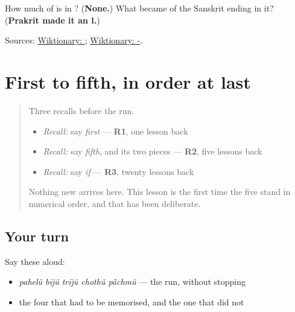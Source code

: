 \begin{tcolorbox}[breakable,colback=teal!4,colframe=teal!35!black,title={Before you move on}]
How much of \textbf{} is in \textbf{}? (\textbf{None.}) What became of the Sanskrit ending in it? (\textbf{Prakrit made it an l.})

Sources: \href{https://en.wiktionary.org/wiki/\%E0\%AA\%AA\%E0\%AA\%B9\%E0\%AB\%87\%E0\%AA\%B2\%E0\%AB\%81\%E0\%AA\%82}{Wiktionary: }; \href{https://en.wiktionary.org/wiki/-\%E0\%AA\%AE\%E0\%AB\%81\%E0\%AA\%82}{Wiktionary: -}.
\end{tcolorbox}
\section[Practice]{First to fifth, in order at last}

\label{lesson:GU-R38-first-to-fifth}



\begin{quote}
Three recalls before the run.

\begin{itemize}
\raggedright
  \item \emph{Recall:} say \emph{first} — \textbf{R1}, one lesson back
  \item \emph{Recall:} say \emph{fifth}, and its two pieces — \textbf{R2}, five lessons back
  \item \emph{Recall:} say \emph{if} — \textbf{R3}, twenty lessons back
\end{itemize}

Nothing new arrives here. This lesson is the first time the five stand in numerical order, and that has been deliberate.
\end{quote}

\subsection*{Your turn}
Say these aloud:

\begin{itemize}
\raggedright
  \item \emph{pahelũ bījũ trījũ chothũ pā̃chmũ} — the run, without stopping
  \item the four that had to be memorised, and the one that did not
\end{itemize}

